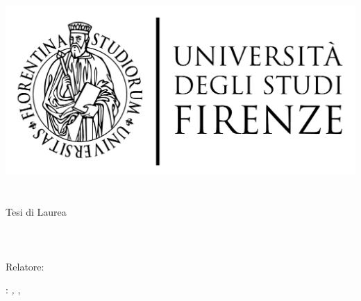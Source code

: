 \begin{titlepage}
	\begin{center}
   	\large
      \hfill
      \vfill
      \begingroup
         \includegraphics[scale=0.15]{logo/LOGO}\\
			\myFaculty \\
			\myDegree \\
			\vspace{0.5cm}
         \vspace{0.5cm}
         Tesi di Laurea
      \endgroup
      \vfill
      \vfill
      \begingroup
      	\color{Maroon}\spacedallcaps{\myItalianTitle} \\ $\ $\\ \spacedallcaps{\myEnglishTitle} \\ $\ $\\
	\bigskip
      \endgroup
      \vfill
      \vfill
            \spacedlowsmallcaps{\myName}
      \vfill
      \vfill
      Relatore: \emph{\myProf}\\
      \vfill
      \vfill
      \vfill
      \vfill
      \myTime
      \vfill
	\end{center}
\end{titlepage}
   \newpage
	\thispagestyle{empty}
	\hfill
	\vfill
	\noindent\myName:
	\textit{\myItalianTitle,}
	\myDegree, \textcopyright\ \myTime

